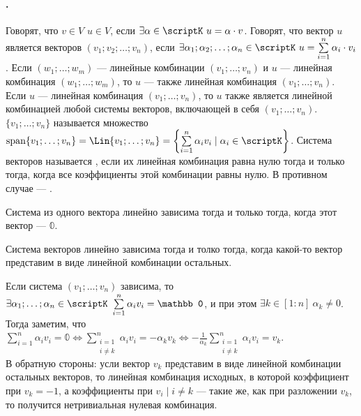 \documentclass{article}
\begin{document}
    \paragraph{.}
    \begin{itemize}
        \dfn Говорят, что $v\in V$  $u\in V$, если $\exists\alpha\in\scriptK~u=\alpha\cdot v$.
        \dfn Говорят, что вектор $u$ является  векторов $(v_1;v_2;\ldots;v_n)$, если $\exists\alpha_1;\alpha_2;\ldots;\alpha_n\in\scriptK~u=\sum\limits_{i=1}^n\alpha_i\cdot v_i$.
        \thm Если $(w_1;\ldots;w_m)$ --- линейные комбинации $(v_1;\ldots;v_n)$ и $u$ --- линейная комбинация $(w_1;\ldots;w_m)$, то $u$ --- также линейная комбинация $(v_1;\ldots;v_n)$.
        \thm Если $u$ --- линейная комбинация $(v_1;\ldots;v_n)$, то $u$ также является линейной комбинацией любой системы векторов, включающей в себя $(v_1;\ldots;v_n)$.
        \dfn {} $\{v_1;\ldots;v_n\}$ называется множество $\operatorname{span}\{v_1;\ldots;v_n\}=\Lin\{v_1;\ldots;v_n\}=\left\{\sum\limits_{i=1}^n\alpha_iv_i\mid\alpha_i\in\scriptK\right\}$.
        \dfn Система векторов называется , если их линейная комбинация равна нулю тогда и только тогда, когда все коэффициенты этой комбинации равны нулю. В противном случае --- .
        \begin{Example}
            Система из одного вектора линейно зависима тогда и только тогда, когда этот вектор --- $\mathbb0$.
        \end{Example}
        \thm Система векторов линейно зависима тогда и толко тогда, когда какой-то вектор представим в виде линейной комбинации остальных.
        \begin{Proof}
            Если система $(v_1;\ldots;v_n)$ зависима, то $\exists\alpha_1;\ldots;\alpha_n\in\scriptK~\sum\limits_{i=1}^n\alpha_iv_i=\mathbb0$, и при этом $\exists k\in[1:n]~\alpha_k\neq0$. Тогда заметим, что $\sum\limits_{i=1}^n\alpha_iv_i=\mathbb0\Leftrightarrow\sum\limits_{\substack{i=1\\i\neq k}}^n\alpha_iv_i=-\alpha_kv_k\Leftrightarrow-\frac1{\alpha_k}\sum\limits_{\substack{i=1\\i\neq k}}^n\alpha_iv_i=v_k$.\\
            В обратную стороны: усли вектор $v_k$ представим в виде линейной комбинации остальных векторов, то линейная комбинация исходных, в которой коэффициент при $v_k=-1$, а коэффициенты при $v_i\mid i\neq k$ --- такие же, как при разложении $v_k$, то получится нетривиальная нулевая комбинация.

\end{Proof}
\end{itemize}
\end{document}
